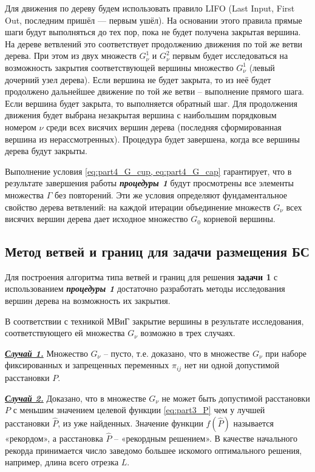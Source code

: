 Для движения по дереву будем использовать правило LIFO (Last Input, First Out, последним пришёл — первым ушёл). На основании этого правила прямые шаги будут выполняться до тех пор, пока не будет получена закрытая вершина. На дереве ветвлений это соответствует продолжению движения по той же ветви дерева. При этом из двух множеств $G^1_\nu$  и $G^2_\nu$ первым будет исследоваться на возможность закрытия соответствующей вершины множество $G^1_\nu$ (левый дочерний узел дерева). Если вершина не будет закрыта, то из неё будет продолжено дальнейшее движение по той же ветви -- выполнение прямого шага. Если вершина будет закрыта, то выполняется обратный шаг. Для продолжения движения будет выбрана незакрытая вершина с наибольшим порядковым номером $\nu$ среди всех висячих вершин дерева (последняя сформированная вершина из нерассмотренных). Процедура будет завершена, когда все вершины дерева будут закрыты.

Выполнение условия \cref{eq:part4_G_cup, eq:part4_G_cap} гарантирует, что в результате завершения работы \textit{\textbf{процедуры 1}} будут просмотрены все элементы множества $\Gamma$ без повторений. Эти же условия определяют фундаментальное свойство дерева ветвлений: на каждой итерации объединение множеств $G_\nu$ всех висячих вершин дерева дает исходное множество $G_0$ корневой вершины.

\subsection{Метод ветвей и границ для задачи размещения БС} \label{BnB}
Для построения алгоритма типа ветвей и границ для решения \textbf{задачи 1} с использованием \textit{\textbf{процедуры 1}} достаточно разработать методы исследования вершин дерева на возможность их закрытия.

В соответствии с техникой МВиГ закрытие вершины в результате исследования, соответствующего ей множества $G_\nu$ возможно в трех случаях.

\underline{\textit{\textbf{Случай 1.}}} Множество $G_\nu$ -- пусто, т.е. доказано, что в множестве $G_\nu$ при наборе фиксированных и запрещенных переменных $\pi_{ij}$ нет ни одной допустимой расстановки $P$.

\underline{\textit{\textbf{Случай 2.}}} Доказано, что в множестве $G_\nu$ не может быть допустимой расстановки $P$ с меньшим значением целевой функции \cref{eq:part3_P} чем у лучшей расстановки $\widehat{P}$, из уже найденных. Значение функции $f(\widehat{P})$ называется «рекордом», а расстановка $\widehat{P}$ -- «рекордным решением». В качестве начального рекорда принимается число заведомо большее искомого оптимального решения, например,  длина всего отрезка $L$.


